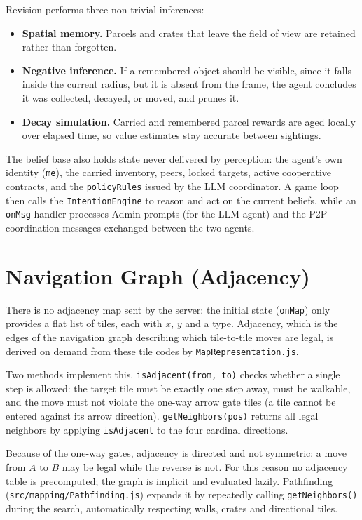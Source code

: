 Revision performs three non-trivial inferences:
\begin{itemize}
  \item \textbf{Spatial memory.} Parcels and crates that leave the field of view
        are retained rather than forgotten.
  \item \textbf{Negative inference.} If a remembered object should be visible, since it falls inside
        the current radius, but it is absent from the frame, the agent
        concludes it was collected, decayed, or moved, and prunes it.
  \item \textbf{Decay simulation.} Carried and remembered parcel rewards are aged
        locally over elapsed time, so value estimates stay accurate between
        sightings.
\end{itemize}

The belief base also holds state never delivered by perception: the agent's own
identity (\texttt{me}), the carried inventory, peers, locked targets, active
cooperative contracts, and the \texttt{policyRules} issued by the LLM coordinator.
A game loop then calls the \texttt{IntentionEngine} to reason and act on the current
beliefs, while an \texttt{onMsg} handler processes Admin prompts (for the LLM agent)
and the P2P coordination messages exchanged between the two agents.

\section{Navigation Graph (Adjacency)}
\label{sec:adjacency}
There is no adjacency map sent by the server: the initial state (\texttt{onMap})
only provides a flat list of tiles, each with $x$, $y$ and a type. Adjacency, which is the
edges of the navigation graph describing which tile-to-tile moves are legal, is
derived on demand from these tile codes by \texttt{MapRepresentation.js}.

Two methods implement this. \texttt{isAdjacent(from, to)} checks whether a single
step is allowed: the target tile must be exactly one step away, must be walkable,
and the move must not violate the one-way arrow gate tiles (a tile cannot be entered
against its arrow direction). \texttt{getNeighbors(pos)} returns all legal neighbors
by applying \texttt{isAdjacent} to the four cardinal directions.

Because of the one-way gates, adjacency is directed and not symmetric: a move from
$A$ to $B$ may be legal while the reverse is not. For this reason no adjacency table
is precomputed; the graph is implicit and evaluated lazily. Pathfinding
(\texttt{src/mapping/Pathfinding.js}) expands it by repeatedly calling
\texttt{getNeighbors()} during the search, automatically respecting walls, crates and directional tiles.

